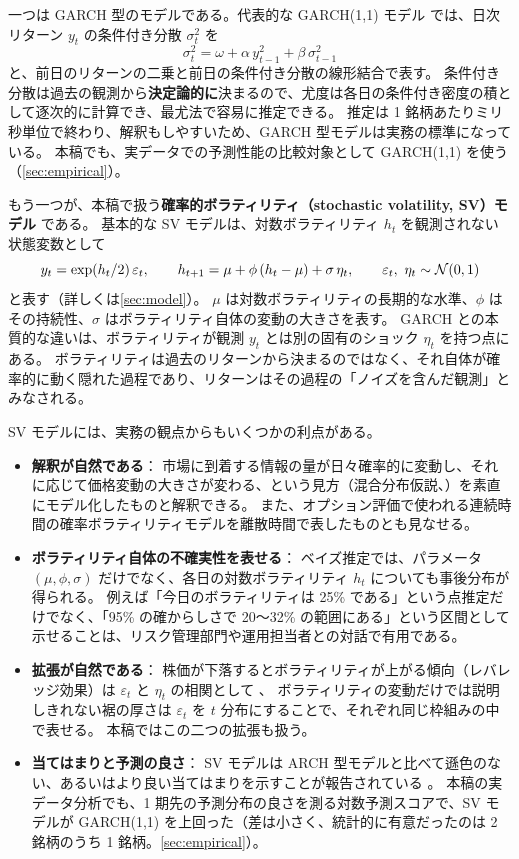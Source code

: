 一つは GARCH 型のモデルである。代表的な GARCH(1,1) モデル \parencite{bollerslev1986} では、日次リターン $y_t$ の条件付き分散 $\sigma_t^2$ を
\[
  \sigma_t^2 = \omega + \alpha\, y_{t-1}^2 + \beta\, \sigma_{t-1}^2
\]
と、前日のリターンの二乗と前日の条件付き分散の線形結合で表す。
条件付き分散は過去の観測から\textbf{決定論的に}決まるので、尤度は各日の条件付き密度の積として逐次的に計算でき、最尤法で容易に推定できる。
推定は 1 銘柄あたりミリ秒単位で終わり、解釈もしやすいため、GARCH 型モデルは実務の標準になっている。
本稿でも、実データでの予測性能の比較対象として GARCH(1,1) を使う（\cref{sec:empirical}）。

もう一つが、本稿で扱う\textbf{確率的ボラティリティ（stochastic volatility, SV）モデル} \parencite{taylor1986} である。
基本的な SV モデルは、対数ボラティリティ $h_t$ を観測されない状態変数として
\[
  y_t = \exp(h_t/2)\, \varepsilon_t, \qquad
  h_{t+1} = \mu + \phi\,(h_t - \mu) + \sigma\, \eta_t, \qquad
  \varepsilon_t,\ \eta_t \sim \mathcal{N}(0, 1)
\]
と表す（詳しくは\cref{sec:model}）。
$\mu$ は対数ボラティリティの長期的な水準、$\phi$ はその持続性、$\sigma$ はボラティリティ自体の変動の大きさを表す。
GARCH との本質的な違いは、ボラティリティが観測 $y_t$ とは別の固有のショック $\eta_t$ を持つ点にある。
ボラティリティは過去のリターンから決まるのではなく、それ自体が確率的に動く隠れた過程であり、リターンはその過程の「ノイズを含んだ観測」とみなされる。

SV モデルには、実務の観点からもいくつかの利点がある。

\begin{itemize}
  \item \textbf{解釈が自然である}：
    市場に到着する情報の量が日々確率的に変動し、それに応じて価格変動の大きさが変わる、という見方（混合分布仮説、\cite{clark1973}）を素直にモデル化したものと解釈できる。
    また、オプション評価で使われる連続時間の確率ボラティリティモデルを離散時間で表したものとも見なせる。
  \item \textbf{ボラティリティ自体の不確実性を表せる}：
    ベイズ推定では、パラメータ $(\mu,\phi,\sigma)$ だけでなく、各日の対数ボラティリティ $h_t$ についても事後分布が得られる。
    例えば「今日のボラティリティは 25\% である」という点推定だけでなく、「95\% の確からしさで 20〜32\% の範囲にある」という区間として示せることは、リスク管理部門や運用担当者との対話で有用である。
  \item \textbf{拡張が自然である}：
    株価が下落するとボラティリティが上がる傾向（レバレッジ効果）は $\varepsilon_t$ と $\eta_t$ の相関として \parencite{omori2007}、
    ボラティリティの変動だけでは説明しきれない裾の厚さは $\varepsilon_t$ を $t$ 分布にすることで、それぞれ同じ枠組みの中で表せる。
    本稿ではこの二つの拡張も扱う。
  \item \textbf{当てはまりと予測の良さ}：
    SV モデルは ARCH 型モデルと比べて遜色のない、あるいはより良い当てはまりを示すことが報告されている \parencite{kim1998}。
    本稿の実データ分析でも、1 期先の予測分布の良さを測る対数予測スコアで、SV モデルが GARCH(1,1) を上回った（差は小さく、統計的に有意だったのは 2 銘柄のうち 1 銘柄。\cref{sec:empirical}）。
\end{itemize}

